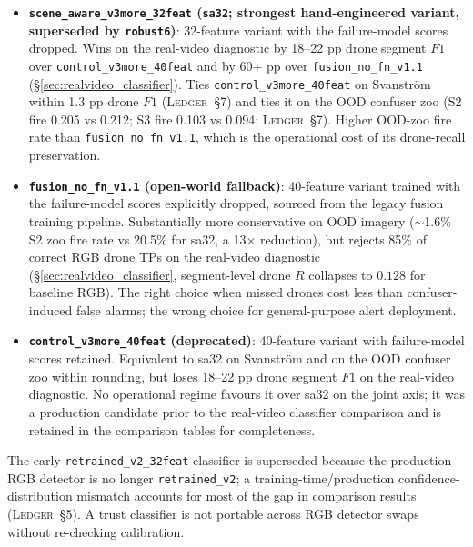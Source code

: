 \begin{itemize}
    \item \textbf{\texttt{scene\_aware\_v3more\_32feat} (\texttt{sa32}; strongest hand-engineered variant, superseded by \texttt{robust6})}: 32-feature variant with the failure-model scores dropped. Wins on the real-video diagnostic by 18--22 pp drone segment $F1$ over \texttt{control\_v3more\_40feat} and by 60+ pp over \texttt{fusion\_no\_fn\_v1.1} (\S\ref{sec:realvideo_classifier}). Ties \texttt{control\_v3more\_40feat} on Svanstr\"om within 1.3 pp drone $F1$ (\textsc{Ledger}~\S7) and ties it on the OOD confuser zoo (S2 fire 0.205 vs 0.212; S3 fire 0.103 vs 0.094; \textsc{Ledger}~\S7). Higher OOD-zoo fire rate than \texttt{fusion\_no\_fn\_v1.1}, which is the operational cost of its drone-recall preservation.
    \item \textbf{\texttt{fusion\_no\_fn\_v1.1} (open-world fallback)}: 40-feature variant trained with the failure-model scores explicitly dropped, sourced from the legacy fusion training pipeline. Substantially more conservative on OOD imagery ($\sim$1.6\% S2 zoo fire rate vs 20.5\% for sa32, a 13$\times$ reduction), but rejects 85\% of correct RGB drone TPs on the real-video diagnostic (\S\ref{sec:realvideo_classifier}, segment-level drone $R$ collapses to $0.128$ for baseline RGB). The right choice when missed drones cost less than confuser-induced false alarms; the wrong choice for general-purpose alert deployment.
    \item \textbf{\texttt{control\_v3more\_40feat} (deprecated)}: 40-feature variant with failure-model scores retained. Equivalent to sa32 on Svanstr\"om and on the OOD confuser zoo within rounding, but loses 18--22 pp drone segment $F1$ on the real-video diagnostic. No operational regime favours it over sa32 on the joint axis; it was a production candidate prior to the real-video classifier comparison and is retained in the comparison tables for completeness.
\end{itemize}

The early \texttt{retrained\_v2\_32feat} classifier is superseded because the production RGB detector is no longer \texttt{retrained\_v2}; a training-time/production confidence-distribution mismatch accounts for most of the gap in comparison results (\textsc{Ledger}~\S5). A trust classifier is not portable across RGB detector swaps without re-checking calibration.

